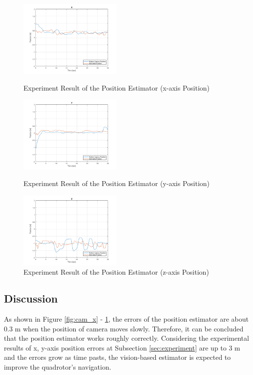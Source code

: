 \begin{figure}
    \centering
    \includegraphics[width=0.45\textwidth]{graphics/cam_x.png}
    \caption{Experiment Result of the Position Estimator (x-axis Position)}
    \label{fig:cam_x}
    \vspace{1cm}
    \includegraphics[width=0.45\textwidth]{graphics/cam_y.png}
    \caption{Experiment Result of the Position Estimator (y-axis Position)}
    \label{fig:cam_y}
    \vspace{1cm} 
    \includegraphics[width=0.45\textwidth]{graphics/cam_z.png}
    \caption{Experiment Result of the Position Estimator (z-axis Position)}
    \label{fig:cam_z}
\end{figure}

\subsection{Discussion}
As shown in Figure \ref{fig:cam_x} - \ref{fig:cam_z}, the errors of the position estimator are about 0.3 m when the position of camera moves slowly. Therefore, it can be concluded that the position estimator works roughly correctly. Considering the experimental results of x, y-axis position errors at Subsection \ref{sec:experiment} are up to 3 m and the errors grow as time pasts, the vision-based estimator is expected to improve the quadrotor's navigation.

